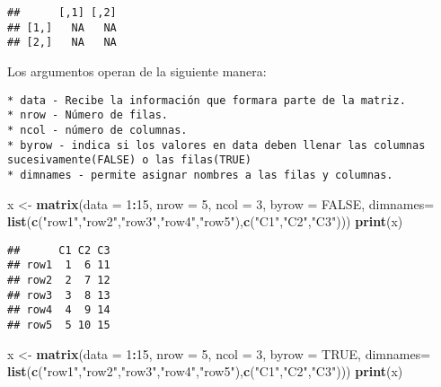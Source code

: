 \documentclass[11pt,]{article}
\newenvironment{Shaded}{\begin{snugshade}}{\end{snugshade}}
\newcommand{\DataTypeTok}[1]{\textcolor[rgb]{0.13,0.29,0.53}{#1}}
\newcommand{\DecValTok}[1]{\textcolor[rgb]{0.00,0.00,0.81}{#1}}
\newcommand{\KeywordTok}[1]{\textcolor[rgb]{0.13,0.29,0.53}{\textbf{#1}}}
\newcommand{\NormalTok}[1]{#1}
\newcommand{\OperatorTok}[1]{\textcolor[rgb]{0.81,0.36,0.00}{\textbf{#1}}}
\newcommand{\OtherTok}[1]{\textcolor[rgb]{0.56,0.35,0.01}{#1}}
\newcommand{\StringTok}[1]{\textcolor[rgb]{0.31,0.60,0.02}{#1}}
\begin{document}
\begin{verbatim}
##      [,1] [,2]
## [1,]   NA   NA
## [2,]   NA   NA
\end{verbatim}

Los argumentos operan de la siguiente manera:

\begin{verbatim}
* data - Recibe la información que formara parte de la matriz.
* nrow - Número de filas. 
* ncol - número de columnas.
* byrow - indica si los valores en data deben llenar las columnas sucesivamente(FALSE) o las filas(TRUE)
* dimnames - permite asignar nombres a las filas y columnas.
\end{verbatim}

\begin{Shaded}
\begin{Highlighting}[]
\NormalTok{x <-}\StringTok{ }\KeywordTok{matrix}\NormalTok{(}\DataTypeTok{data =} \DecValTok{1}\OperatorTok{:}\DecValTok{15}\NormalTok{, }\DataTypeTok{nrow =} \DecValTok{5}\NormalTok{, }\DataTypeTok{ncol =} \DecValTok{3}\NormalTok{, }\DataTypeTok{byrow =} \OtherTok{FALSE}\NormalTok{, }\DataTypeTok{dimnames=} \KeywordTok{list}\NormalTok{(}\KeywordTok{c}\NormalTok{(}\StringTok{"row1"}\NormalTok{,}\StringTok{"row2"}\NormalTok{,}\StringTok{"row3"}\NormalTok{,}\StringTok{"row4"}\NormalTok{,}\StringTok{"row5"}\NormalTok{),}\KeywordTok{c}\NormalTok{(}\StringTok{"C1"}\NormalTok{,}\StringTok{"C2"}\NormalTok{,}\StringTok{"C3"}\NormalTok{)))}
\KeywordTok{print}\NormalTok{(x)}
\end{Highlighting}
\end{Shaded}

\begin{verbatim}
##      C1 C2 C3
## row1  1  6 11
## row2  2  7 12
## row3  3  8 13
## row4  4  9 14
## row5  5 10 15
\end{verbatim}

\begin{Shaded}
\begin{Highlighting}[]
\NormalTok{x <-}\StringTok{ }\KeywordTok{matrix}\NormalTok{(}\DataTypeTok{data =} \DecValTok{1}\OperatorTok{:}\DecValTok{15}\NormalTok{, }\DataTypeTok{nrow =} \DecValTok{5}\NormalTok{, }\DataTypeTok{ncol =} \DecValTok{3}\NormalTok{, }\DataTypeTok{byrow =} \OtherTok{TRUE}\NormalTok{, }\DataTypeTok{dimnames=} \KeywordTok{list}\NormalTok{(}\KeywordTok{c}\NormalTok{(}\StringTok{"row1"}\NormalTok{,}\StringTok{"row2"}\NormalTok{,}\StringTok{"row3"}\NormalTok{,}\StringTok{"row4"}\NormalTok{,}\StringTok{"row5"}\NormalTok{),}\KeywordTok{c}\NormalTok{(}\StringTok{"C1"}\NormalTok{,}\StringTok{"C2"}\NormalTok{,}\StringTok{"C3"}\NormalTok{)))}
\KeywordTok{print}\NormalTok{(x)}
\end{Highlighting}
\end{Shaded}
\end{document}
